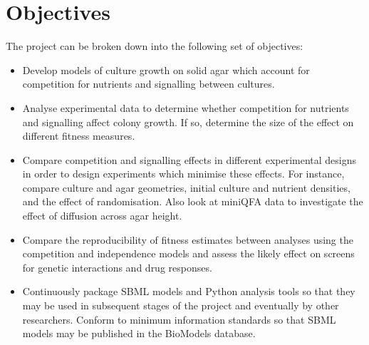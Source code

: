 
\section{Objectives}
\label{sec:objectives}
The project can be broken down into the following set of objectives:
\begin{itemize}
\item Develop models of culture growth on solid agar which account for
  competition for nutrients and signalling between cultures.
\item Analyse experimental data to determine whether competition for
  nutrients and signalling affect colony growth. If so, determine the
  size of the effect on different fitness measures.
\item Compare competition and signalling effects in different
  experimental designs in order to design experiments which minimise
  these effects. For instance, compare culture and agar geometries,
  initial culture and nutrient densities, and the effect of randomisation. Also
  look at miniQFA data to investigate the effect of diffusion across agar height.
\item Compare the reproducibility of fitness estimates between
  analyses using the competition and independence models and assess the
  likely effect on screens for genetic interactions and drug responses.
\item Continuously package SBML models and Python analysis tools so
  that they may be used in subsequent stages of the project and
  eventually by other researchers. Conform to minimum information standards so
  that SBML models may be published in the BioModels database.
\end{itemize}

